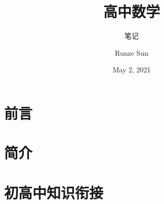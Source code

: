 \documentclass[cn,10pt,math=newtx,citestyle=gb7714-2015,bibstyle=gb7714-2015]{elegantbook}
\title{高中数学}
\subtitle{笔记}
\author{Runze Sun}
\institute{LearAwesome}
\date{May 2, 2021}
\begin{document}
\maketitle
\frontmatter

\chapter*{前言}


\newpage
\chapter*{简介}



\tableofcontents

\mainmatter

\chapter{初高中知识衔接}

\end{document}
